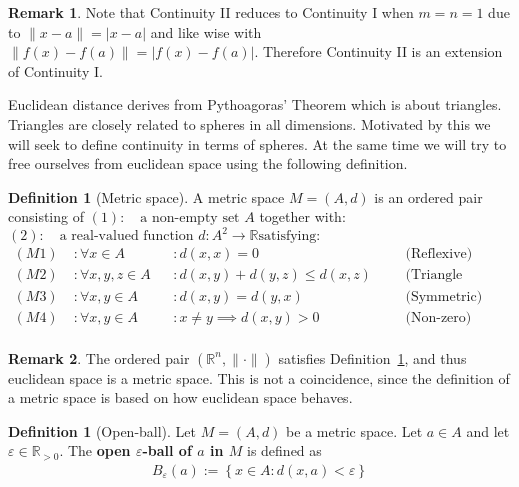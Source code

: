 \documentclass{article}
\theoremstyle{plain}
\theoremstyle{definition}
\newtheorem*{remark}{Remark}
\newtheorem{definition}[theorem]{Definition}
\newcommand{\R}{\mathbb{R}}
\begin{document}
\begin{remark}
	Note that Continuity II reduces to Continuity I when $m=n=1$ due to
	$\|x-a\|=|x-a|$ and like wise with $\|f(x)-f(a)\|=|f(x)-f(a)|$. Therefore
	Continuity II is an extension of Continuity I.
\end{remark}
Euclidean distance derives from Pythoagoras' Theorem which is
about triangles. Triangles are closely related to spheres in all
dimensions. Motivated by this we will seek to define continuity in terms
of spheres. At the same time we will try to free ourselves from euclidean
space using the following definition.
\begin{definition}[Metric space]\label{def:metric space}
	A metric space $M=(A,d)$ is an ordered pair consisting of\newline
	$(1):\quad \text{a non-empty set }A$\newline
	together with:\newline
		$(2):\quad \text{a real-valued function } d:A^2\rightarrow\R \text{
		satisfying:}$
	\begin{equation}
	\begin{aligned}
		(M1)\; &:\forall x\in A &&:d(x,x)=0
			   &&&\text{(Reflexive)}\\
		(M2)\; &:\forall x,y,z\in A &&:d(x,y)+d(y,z)\leq d(x,z)
			   &&&\text{(Triangle inequality)}\\
		(M3)\; &:\forall x,y\in A &&:d(x,y)=d(y,x)
			   &&&\text{(Symmetric)}\\
		(M4)\; &:\forall x,y\in A &&: x\neq y\implies d(x,y)>0
			   &&&\text{(Non-zero)}\\
	\end{aligned}
	\end{equation}
\end{definition}
\begin{remark}
	The ordered pair $(\R^n,\|\cdot\|)$ satisfies
	Definition~\ref{def:metric space}, and thus euclidean space is
	a metric space. This is not a coincidence, since the definition
	of a metric space is based on how euclidean space behaves.
\end{remark}
\begin{definition}[Open-ball]\label{def:open-ball}
	Let $M=(A,d)$ be a metric space. Let $a\in A$ and let
	$\varepsilon\in\R_{>0}$. The \textbf{open $\varepsilon$-ball of $a$ in $M$}
	is defined as
	\begin{equation}
	\begin{aligned}
		B_{\varepsilon}(a):=\left\{x\in A: d(x,a)<\varepsilon\right\}
	\end{aligned}
	\end{equation}
\end{definition}
\end{document}
